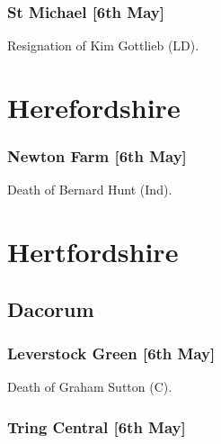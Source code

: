 \documentclass[a4paper,openany]{book}
\begin{document}
\begin{resultsiii}
\subsubsection*{St Michael \hspace*{\fill}\nolinebreak[1]%
	\enspace\hspace*{\fill}
	[6th May]}


Resignation of Kim Gottlieb (LD).

\section{Herefordshire}

\subsubsection*{Newton Farm \hspace*{\fill}\nolinebreak[1]%
	\enspace\hspace*{\fill}
	[6th May]}


Death of Bernard Hunt (Ind).

\section{Hertfordshire}

\subsection*{Dacorum}

\subsubsection*{Leverstock Green \hspace*{\fill}\nolinebreak[1]%
	\enspace\hspace*{\fill}
	[6th May]}


Death of Graham Sutton (C).

\subsubsection*{Tring Central \hspace*{\fill}\nolinebreak[1]%
	\enspace\hspace*{\fill}
	[6th May]}


\end{resultsiii}
\end{document}
